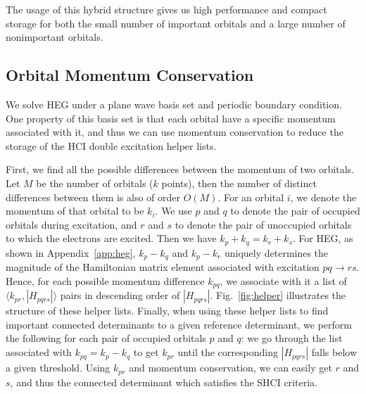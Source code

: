 The usage of this hybrid structure gives us high performance and compact storage for both the small number of important orbitals and a large number of nonimportant orbitals.

\subsection{Orbital Momentum Conservation}
We solve HEG under a plane wave basis set and periodic boundary condition.
One property of this basis set is that each orbital have a specific momentum associated with it, and thus we can use momentum conservation to reduce the storage of the HCI double excitation helper lists.

First, we find all the possible differences between the momentum of two orbitals.
Let $M$ be the number of orbitals ($k$ points), then the number of distinct differences between them is also of order $O(M)$.
For an orbital $i$, we denote the momentum of that orbital to be $k_{i}$.
We use $p$ and $q$ to denote the pair of occupied orbitals during excitation, and $r$ and $s$ to denote the pair of unoccupied orbitals to which the electrons are excited.
Then we have $k_p + k_q = k_r + k_s$.
For HEG, as shown in Appendix~\ref{app:heg}, $k_p - k_q$ and $k_p - k_r$ uniquely determines the magnitude of the Hamiltonian matrix element associated with excitation $pq\to rs$.
Hence, for each possible momentum difference $k_{pq}$, we associate with it a list of $\langle k_{pr}, |H_{pqrs}|\rangle$ pairs in descending order of $|H_{pqrs}|$.
Fig.~\ref{fig:helper} illustrates the structure of these helper lists.
Finally, when using these helper lists to find important connected determinants to a given reference determinant, we perform the following for each pair of occupied orbitals $p$ and $q$: we go through the list associated with $k_{pq} = k_p - k_q$ to get $k_{pr}$ until the corresponding $|H_{pqrs}|$ falls below a given threshold.
Using $k_{pr}$ and momentum conservation, we can easily get $r$ and $s$, and thus the connected determinant which satisfies the SHCI criteria.
